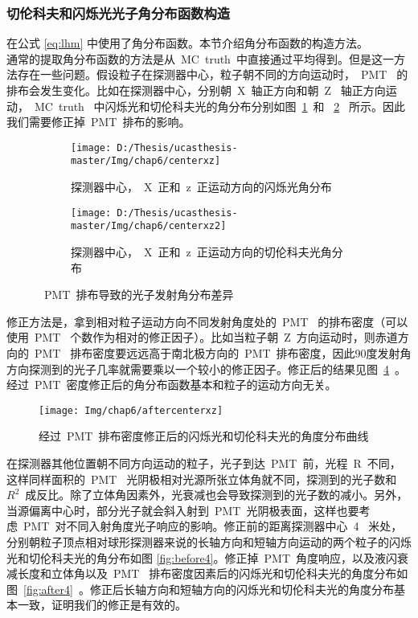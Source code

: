 \subsubsection{切伦科夫和闪烁光光子角分布函数构造}
在公式 \ref{eq:lhm} 中使用了角分布函数。本节介绍角分布函数的构造方法。\\
通常的提取角分布函数的方法是从~MC~truth~中直接通过平均得到。但是这一方法存在一些问题。假设粒子在探测器中心，粒子朝不同的方向运动时，~PMT~ 的排布会发生变化。比如在探测器中心，分别朝~X~轴正方向和朝~Z~ 轴正方向运动，~MC~truth~ 中闪烁光和切伦科夫光的角分布分别如图~\ref{fig:centerxz_1}~和~
\ref{fig:centerxz_2}~ 所示。因此我们需要修正掉~PMT~排布的影响。
\begin{figure}[!htbp]
  \centering
  \begin{subfigure}[b]{\MySubFactor\textwidth}
    \texttt{[image: D:/Thesis/ucasthesis-master/Img/chap6/centerxz]}
    \caption{探测器中心，~X~正和~z~正运动方向的闪烁光角分布}
    \label{fig:centerxz_1}
  \end{subfigure}%
  \quad\quad\quad\quad%
  \begin{subfigure}[b]{\MySubFactor\textwidth}
    \texttt{[image: D:/Thesis/ucasthesis-master/Img/chap6/centerxz2]}
    \caption{探测器中心，~X~正和~z~正运动方向的切伦科夫光角分布}
    \label{fig:centerxz_2}
  \end{subfigure}
  \caption{~PMT~排布导致的光子发射角分布差异}
  \label{fig:centerxz}
\end{figure}
修正方法是，拿到相对粒子运动方向不同发射角度处的~PMT~ 的排布密度（可以使用~PMT~ 个数作为相对的修正因子）。比如当粒子朝~Z~方向运动时，则赤道方向的~PMT~ 排布密度要远远高于南北极方向的~PMT~排布密度，因此90度发射角方向探测到的光子几率就需要乘以一个较小的修正因子。修正后的结果见图~\ref{fig:aftercenterxz}~。 经过~PMT~密度修正后的角分布函数基本和粒子的运动方向无关。\\
\begin{figure}[!htbp]
  \centering
   \texttt{[image: Img/chap6/aftercenterxz]}
    \caption{经过~PMT~排布密度修正后的闪烁光和切伦科夫光的角度分布曲线}
  \label{fig:aftercenterxz}
\end{figure}
在探测器其他位置朝不同方向运动的粒子，光子到达~PMT~前，光程~R~不同，这样同样面积的~PMT~ 光阴极相对光源所张立体角就不同，探测到的光子数和~$R^2$~成反比。除了立体角因素外，光衰减也会导致探测到的光子数的减小。另外，当源偏离中心时，部分光子就会斜入射到~PMT~光阴极表面，这样也要考虑~PMT~对不同入射角度光子响应的影响。修正前的距离探测器中心~4~ 米处，分别朝粒子顶点相对球形探测器来说的长轴方向和短轴方向运动的两个粒子的闪烁光和切伦科夫光的角分布如图
\ref{fig:before4}。修正掉~PMT~角度响应，以及液闪衰减长度和立体角以及~PMT~ 排布密度因素后的闪烁光和切伦科夫光的角度分布如图~\ref{fig:after4}~。修正后长轴方向和短轴方向的闪烁光和切伦科夫光的角度分布基本一致，证明我们的修正是有效的。

